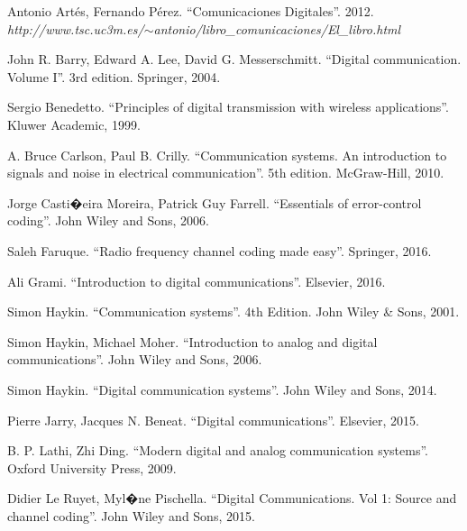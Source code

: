 \documentclass[es,apuntes]{uah}
\begin{document}
\profesor{}
\tel{}
\mail{} %
\date{} %

\maketitle


\begin{thebibliography}{100}

 Antonio Artés, Fernando Pérez. ``Comunicaciones Digitales''. 2012. \emph{http://www.tsc.uc3m.es/$\sim$antonio/libro\_comunicaciones/El\_libro.html}

 John R. Barry, Edward A. Lee, David G. Messerschmitt. ``Digital communication. Volume I''. 3rd edition. Springer, 2004.  

 Sergio Benedetto. ``Principles of digital transmission with wireless applications''. Kluwer Academic, 1999.

 A. Bruce Carlson, Paul B. Crilly. ``Communication systems. An introduction to signals and noise in electrical communication''. 5th edition. McGraw-Hill, 2010.

 Jorge Casti�eira Moreira, Patrick Guy Farrell. ``Essentials of error-control coding''. John Wiley and Sons, 2006.

 Saleh Faruque. ``Radio frequency channel coding made easy''. Springer, 2016.

 Ali Grami. ``Introduction to digital communications''. Elsevier, 2016.

 Simon Haykin. ``Communication systems''. 4th Edition. John Wiley \& Sons, 2001.

 Simon Haykin, Michael Moher. ``Introduction to analog and digital communications''. John Wiley and Sons, 2006.

 Simon Haykin. ``Digital communication systems''. John Wiley and Sons, 2014.

 Pierre Jarry, Jacques N. Beneat. ``Digital communications''. Elsevier, 2015.

 B. P. Lathi, Zhi Ding. ``Modern digital and analog communication systems''. Oxford University Press, 2009.

 Didier Le Ruyet, Myl�ne Pischella. ``Digital Communications. Vol 1: Source and channel coding''. John Wiley and Sons, 2015.


\end{thebibliography}
\end{document}
